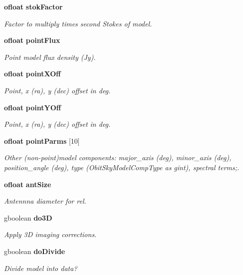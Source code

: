 \begin{CompactItemize}
{\bf ofloat} {\bf stok\-Factor}
\begin{CompactList}\small\item\em Factor to multiply times second Stokes of model. \item\end{CompactList}\item 
{\bf ofloat} {\bf point\-Flux}
\begin{CompactList}\small\item\em Point model flux density (Jy). \item\end{CompactList}\item 
{\bf ofloat} {\bf point\-XOff}
\begin{CompactList}\small\item\em Point, x (ra), y (dec) offset in deg. \item\end{CompactList}\item 
{\bf ofloat} {\bf point\-YOff}
\begin{CompactList}\small\item\em Point, x (ra), y (dec) offset in deg. \item\end{CompactList}\item 
{\bf ofloat} {\bf point\-Parms} [10]
\begin{CompactList}\small\item\em Other (non-point)model components: major\_\-axis (deg), minor\_\-axis (deg), position\_\-angle (deg), type (Obit\-Sky\-Model\-Comp\-Type as gint), spectral terms;. \item\end{CompactList}\item 
{\bf ofloat} {\bf ant\-Size}
\begin{CompactList}\small\item\em Antennna diameter for rel. \item\end{CompactList}\item 
gboolean {\bf do3D}
\begin{CompactList}\small\item\em Apply 3D imaging corrections. \item\end{CompactList}\item 
gboolean {\bf do\-Divide}
\begin{CompactList}\small\item\em Divide model into data? \item\end{CompactList}\item 

\end{CompactItemize}

